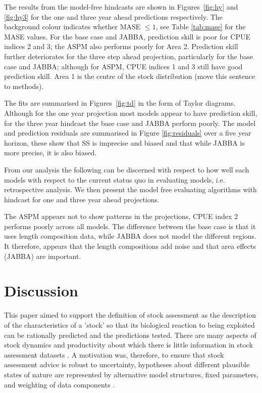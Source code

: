 \documentclass[12pt,halfline,a4paper,nonumbib]{ouparticle}
\begin{document}
The results from the model-free hindcasts are shown in Figures~\ref{fig:hy} and \ref{fig:hy3} for the one and three year ahead predictions respectively. The background colour indicates whether MASE $\le 1$, see Table \ref{tab:mase} for the MASE values. For the base case and JABBA, prediction skill is poor for CPUE indices 2 and 3; the ASPM also performs poorly for Area 2. Prediction skill further deteriorates for the three step ahead projection, particularly for the base case and JABBA; although for ASPM, CPUE indices 1 and 3 still have good prediction skill. Area 1 is the centre of the stock distribution (move this sentence to methods).

The fits are summarised in Figures~\ref{fig:td} in the form of Taylor diagrams. Although for the one year projection most models appear to have prediction skill, for the three year hindcast the base case and JABBA perform poorly. The model and prediction residuals are summarised in Figure \ref{fig:residuals} over a five year horizon, these show that SS is imprecise and biased and that while JABBA is more precise, it is also biased.

From our analysis the following can be discerned with respect to how well each models with respect to the current status quo in evaluating models, i.e. retrospective analysis. We then present the model free evaluating algorithms with hindcast for one and three year ahead projections. 

The ASPM appears not to show patterns in the projections, CPUE index 2 performs poorly across all models. The difference between the base case is that it uses length composition data, while JABBA does not model the different regions. It therefore, appears that the length compositions add noise and that area effects (JABBA) are important. 


\section{Discussion}

This paper aimed to support the definition of stock assessment as the description of the characteristics of a ’stock’ so that its biological reaction to being exploited can be rationally predicted and the predictions tested. There are many aspects of stock dynamics and productivity about which there is little information in stock assessment datasets \parencite[e.g.][]{lee2011m,lee2012steepness, jiao2012modelling,simon2012effects,pepin2015reconsidering,cury2014resolving}. A motivation was, therefore, to ensure that stock assessment advice is robust to uncertainty, hypotheses about different plausible states of nature are represented by alternative model structures, fixed parameters, and weighting of data components \parencite[][]{sharma2020trfmo}. 
\end{document}
